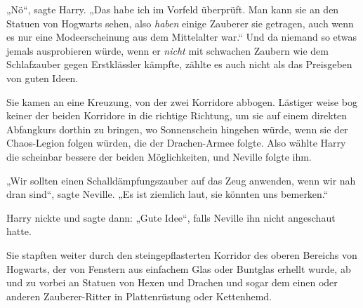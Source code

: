 „Nö“, sagte Harry.
„Das habe ich im Vorfeld überprüft. Man kann sie an den Statuen von Hogwarts sehen, also \emph{haben} einige Zauberer sie getragen, auch wenn es nur eine Modeerscheinung aus dem Mittelalter war.“ Und da niemand so etwas jemals ausprobieren würde, wenn er \emph{nicht} mit schwachen Zaubern wie dem Schlafzauber gegen Erstklässler kämpfte, zählte es auch nicht als das Preisgeben von guten Ideen.

Sie kamen an eine Kreuzung, von der zwei Korridore abbogen. Lästiger weise bog keiner der beiden Korridore in die richtige Richtung, um sie auf einem direkten Abfangkurs dorthin zu bringen, wo Sonnenschein hingehen würde, wenn sie der Chaos-Legion folgen würden, die der Drachen-Armee folgte. Also wählte Harry die scheinbar bessere der beiden Möglichkeiten, und Neville folgte ihm.

„Wir sollten einen Schalldämpfungszauber auf das Zeug anwenden, wenn wir nah dran sind“, sagte Neville.
„Es ist ziemlich laut, sie könnten uns bemerken.“

Harry nickte und sagte dann:
„Gute Idee“, falls Neville ihn nicht angeschaut hatte.

Sie stapften weiter durch den steingepflasterten Korridor des oberen Bereichs von Hogwarts, der von Fenstern aus einfachem Glas oder Buntglas erhellt wurde, ab und zu vorbei an Statuen von Hexen und Drachen und sogar dem einen oder anderen Zauberer-Ritter in Plattenrüstung oder Kettenhemd.

